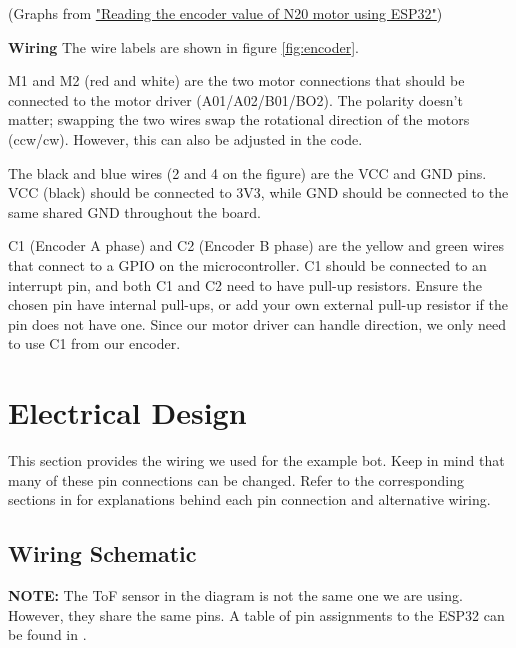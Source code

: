 \documentclass[11pt]{report}
\begin{document}
	\noindent
	\begin{center}
		(Graphs from \href{https://www.hackster.io/amal-shaji/reading-the-encoder-value-of-n20-motor-using-esp32-56575a}
		{"Reading the encoder value of N20 motor using ESP32"})
	\end{center}

	\newpage

	\noindent
	\textbf{Wiring}
	\newline
	\noindent
	The wire labels are shown in figure \ref{fig:encoder}. 
	\newline

	\noindent
	M1 and M2 (red and white) are the two motor connections that should be connected to the motor driver (A01/A02/B01/BO2). 
	The polarity doesn't matter; swapping the two wires swap the rotational direction of the motors (ccw/cw). However, this 
	can also be adjusted in the code. 
	\newline

	\noindent
	The black and blue wires (2 and 4 on the figure) are the VCC and GND pins. VCC (black) should be connected to 3V3, while 
	GND should be connected to the same shared GND throughout the board. 
	\newline

	\noindent
	C1 (Encoder A phase) and C2 (Encoder B phase) are the yellow and green wires that connect to a GPIO on the microcontroller. 
	C1 should be connected to an interrupt pin, and both C1 and C2 need to have pull-up resistors. Ensure the chosen pin have
	internal pull-ups, or add your own external pull-up resistor if the pin does not have one. Since our motor driver can handle
	direction, we only need to use C1 from our encoder. 

\chapter{Electrical Design}
	This section provides the wiring we used for the example bot. Keep in mind that many of these pin connections can be changed. 
	Refer to the corresponding sections in  for explanations behind each pin connection and 
	alternative wiring. 

    \section{Wiring Schematic}
	\textbf{NOTE:} The ToF sensor in the diagram is not the same one we are using. However, they share the same pins. A table of 
	pin assignments to the ESP32 can be found in .
\end{document}
